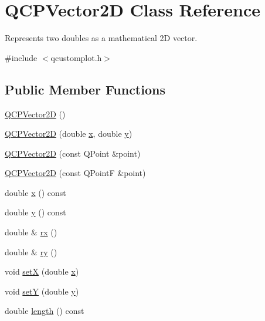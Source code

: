 \hypertarget{class_q_c_p_vector2_d}{}\section{Q\+C\+P\+Vector2D Class Reference}
\label{class_q_c_p_vector2_d}


Represents two doubles as a mathematical 2D vector.  




{\ttfamily \#include $<$qcustomplot.\+h$>$}

\subsection*{Public Member Functions}
\begin{DoxyCompactItemize}
\item 
\hyperlink{class_q_c_p_vector2_d_a04c90748c3623044c79fa20788ffbcc6}{Q\+C\+P\+Vector2D} ()
\item 
\hyperlink{class_q_c_p_vector2_d_a47bd86cebc5588dad6ec84349d9098d4}{Q\+C\+P\+Vector2D} (double \hyperlink{class_q_c_p_vector2_d_a4a099e1f9788d52cb46deb8139aa6195}{x}, double \hyperlink{class_q_c_p_vector2_d_a6398fb643ba380d7961a4b208f4eecf1}{y})
\item 
\hyperlink{class_q_c_p_vector2_d_ad8f30a064dc37c90a7ba5e6732ceb5bb}{Q\+C\+P\+Vector2D} (const Q\+Point \&point)
\item 
\hyperlink{class_q_c_p_vector2_d_a3c16eba1006c210ffc3299253fef2339}{Q\+C\+P\+Vector2D} (const Q\+PointF \&point)
\item 
double \hyperlink{class_q_c_p_vector2_d_a4a099e1f9788d52cb46deb8139aa6195}{x} () const
\item 
double \hyperlink{class_q_c_p_vector2_d_a6398fb643ba380d7961a4b208f4eecf1}{y} () const
\item 
double \& \hyperlink{class_q_c_p_vector2_d_a1516252dac9eb5ffb7ddb17fb26e60e0}{rx} ()
\item 
double \& \hyperlink{class_q_c_p_vector2_d_aa8f59a5b54aec8be8e4d1f39db892fea}{ry} ()
\item 
void \hyperlink{class_q_c_p_vector2_d_ab4249e6ce7bfc37be56f014c54b761ae}{setX} (double \hyperlink{class_q_c_p_vector2_d_a4a099e1f9788d52cb46deb8139aa6195}{x})
\item 
void \hyperlink{class_q_c_p_vector2_d_ada288019aa8cd51e3b30acfc07b461dc}{setY} (double \hyperlink{class_q_c_p_vector2_d_a6398fb643ba380d7961a4b208f4eecf1}{y})
\item 
double \hyperlink{class_q_c_p_vector2_d_a10adb5ab031fe94f0b64a3c5aefb552e}{length} () const

\end{DoxyCompactItemize}
